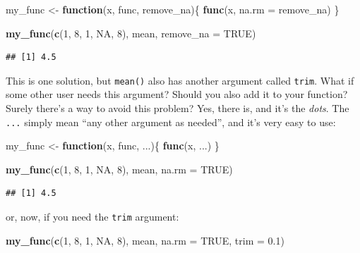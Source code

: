 \documentclass[]{gitbook}
\newenvironment{Shaded}{\begin{snugshade}}{\end{snugshade}}
\newcommand{\ControlFlowTok}[1]{\textcolor[rgb]{0.13,0.29,0.53}{\textbf{#1}}}
\newcommand{\DataTypeTok}[1]{\textcolor[rgb]{0.13,0.29,0.53}{#1}}
\newcommand{\DecValTok}[1]{\textcolor[rgb]{0.00,0.00,0.81}{#1}}
\newcommand{\FloatTok}[1]{\textcolor[rgb]{0.00,0.00,0.81}{#1}}
\newcommand{\KeywordTok}[1]{\textcolor[rgb]{0.13,0.29,0.53}{\textbf{#1}}}
\newcommand{\NormalTok}[1]{#1}
\newcommand{\OtherTok}[1]{\textcolor[rgb]{0.56,0.35,0.01}{#1}}
\newcommand{\StringTok}[1]{\textcolor[rgb]{0.31,0.60,0.02}{#1}}
\begin{document}
\begin{Shaded}
\begin{Highlighting}[]
\NormalTok{my_func <-}\StringTok{ }\ControlFlowTok{function}\NormalTok{(x, func, remove_na)\{}
  \KeywordTok{func}\NormalTok{(x, }\DataTypeTok{na.rm =}\NormalTok{ remove_na)}
\NormalTok{\}}

\KeywordTok{my_func}\NormalTok{(}\KeywordTok{c}\NormalTok{(}\DecValTok{1}\NormalTok{, }\DecValTok{8}\NormalTok{, }\DecValTok{1}\NormalTok{, }\OtherTok{NA}\NormalTok{, }\DecValTok{8}\NormalTok{), mean, }\DataTypeTok{remove_na =} \OtherTok{TRUE}\NormalTok{)}
\end{Highlighting}
\end{Shaded}

\begin{verbatim}
## [1] 4.5
\end{verbatim}

This is one solution, but \texttt{mean()} also has another argument called \texttt{trim}. What if some other
user needs this argument? Should you also add it to your function? Surely there's a way to avoid
this problem? Yes, there is, and it's the \emph{dots}. The \texttt{...} simply mean ``any other
argument as needed'', and it's very easy to use:

\begin{Shaded}
\begin{Highlighting}[]
\NormalTok{my_func <-}\StringTok{ }\ControlFlowTok{function}\NormalTok{(x, func, ...)\{}
  \KeywordTok{func}\NormalTok{(x, ...)}
\NormalTok{\}}

\KeywordTok{my_func}\NormalTok{(}\KeywordTok{c}\NormalTok{(}\DecValTok{1}\NormalTok{, }\DecValTok{8}\NormalTok{, }\DecValTok{1}\NormalTok{, }\OtherTok{NA}\NormalTok{, }\DecValTok{8}\NormalTok{), mean, }\DataTypeTok{na.rm =} \OtherTok{TRUE}\NormalTok{)}
\end{Highlighting}
\end{Shaded}

\begin{verbatim}
## [1] 4.5
\end{verbatim}

or, now, if you need the \texttt{trim} argument:

\begin{Shaded}
\begin{Highlighting}[]
\KeywordTok{my_func}\NormalTok{(}\KeywordTok{c}\NormalTok{(}\DecValTok{1}\NormalTok{, }\DecValTok{8}\NormalTok{, }\DecValTok{1}\NormalTok{, }\OtherTok{NA}\NormalTok{, }\DecValTok{8}\NormalTok{), mean, }\DataTypeTok{na.rm =} \OtherTok{TRUE}\NormalTok{, }\DataTypeTok{trim =} \FloatTok{0.1}\NormalTok{)}
\end{Highlighting}
\end{Shaded}
\end{document}
